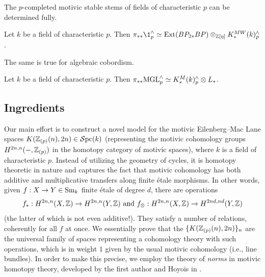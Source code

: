\documentclass{amsart}
\numberwithin{proposition}{section}
\numberwithin{equation}{section}
\def\Ext{\mathrm{Ext}}
\newcommand{\comp}{{{\kern -.5pt}\wedge}}
\begin{document}
The $p$-completed motivic stable stems of fields of characteristic $p$ can be determined fully.
\begin{theorem}
Let $k$ be a field of characteristic $p$.
Then $\pi_{**} \1_p^\comp \wequi \Ext(BP_{2*}BP) \otimes_{\Z[\eta]} K_*^{MW}(k)_p^\comp$.
\end{theorem}

The same is true for algebraic cobordism.
\begin{theorem}
Let $k$ be a field of characteristic $p$.
Then $\pi_{**} \MGL_p^\comp \wequi K_*^M(k)_p^\comp \otimes L_*$.
\end{theorem}

\subsection{Ingredients}
Our main effort is to construct a novel model for the motivic Eilenberg--Mac Lane spaces $K(\mathbb{Z}_{(p)}(n), 2n) \in \mathcal{S}\mathrm{pc}{}(k)$ (representing the motivic cohomology groups $H^{2n,n}(\mathord-, \mathbb{Z}_{(p)})$ in the homotopy category of motivic spaces), where $k$ is a field of characteristic $p$.
Instead of utilizing the geometry of cycles, it is homotopy theoretic in nature and captures the fact that motivic cohomology has both additive and multiplicative transfers along finite étale morphisms.
In other words, given $f: X \to Y \in {\mathrm{S}\mathrm{m}}_k$ finite étale of degree $d$, there are operations \[ f_*: H^{2n,n}(X, \mathbb{Z}) \to H^{2n,n}(Y, \mathbb{Z}) \text{ and } f_\otimes: H^{2n,n}(X, \mathbb{Z}) \to H^{2nd,nd}(Y, \mathbb{Z}) \] (the latter of which is not even additive!).
They satisfy a number of relations, coherently for all $f$ at once.
We essentially prove that the $\{K(\mathbb{Z}_{(p)}(n), 2n)\}_n$ are the universal family of spaces representing a cohomology theory with such operations, which is in weight $1$ given by the usual motivic cohomology (i.e., line bundles).
In order to make this precise, we employ the theory of \emph{norms} in motivic homotopy theory, developed by the first author and Hoyois in \cite{bachmann-norms}.
\end{document}
